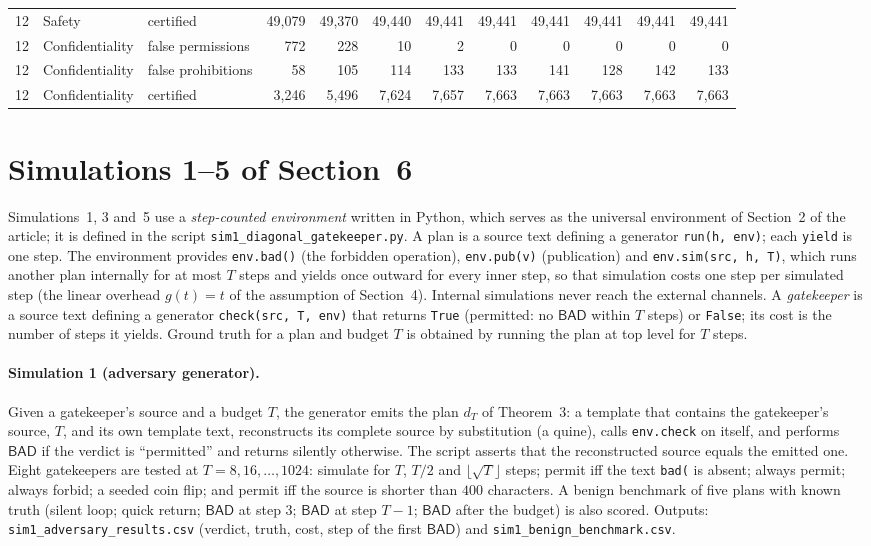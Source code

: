 \documentclass[11pt]{article}
\newcommand{\bad}{\mathsf{BAD}}
\begin{document}
\begin{table}[tbp]
\begin{tabular}{lllrrrrrrrrr}
12 & Safety & certified & 49,079 & 49,370 & 49,440 & 49,441 & 49,441 & 49,441 & 49,441 & 49,441 & 49,441\\
12 & Confidentiality & false permissions & 772 & 228 & 10 & 2 & 0 & 0 & 0 & 0 & 0\\
12 & Confidentiality & false prohibitions & 58 & 105 & 114 & 133 & 133 & 141 & 128 & 142 & 133\\
12 & Confidentiality & certified & 3,246 & 5,496 & 7,624 & 7,657 & 7,663 & 7,663 & 7,663 & 7,663 & 7,663\\
\bottomrule
\end{tabular}
\end{table}

\section{Simulations 1--5 of Section~6}
\label{sec:S1sims}
Simulations~1, 3 and~5 use a \emph{step-counted environment} written in Python, which serves as the universal environment of Section~2 of the article; it is defined in the script \texttt{sim1\_diagonal\_gatekeeper.py}. A plan is a source text defining a generator \texttt{run(h, env)}; each \texttt{yield} is one step. The environment provides \texttt{env.bad()} (the forbidden operation), \texttt{env.pub(v)} (publication) and \texttt{env.sim(src, h, T)}, which runs another plan internally for at most $T$ steps and yields once outward for every inner step, so that simulation costs one step per simulated step (the linear overhead $g(t)=t$ of the assumption of Section~4). Internal simulations never reach the external channels. A \emph{gatekeeper} is a source text defining a generator \texttt{check(src, T, env)} that returns \texttt{True} (permitted: no $\bad$ within $T$ steps) or \texttt{False}; its cost is the number of steps it yields. Ground truth for a plan and budget $T$ is obtained by running the plan at top level for $T$ steps.

\paragraph{Simulation 1 (adversary generator).} Given a gatekeeper's source and a budget $T$, the generator emits the plan $d_T$ of Theorem~3: a template that contains the gatekeeper's source, $T$, and its own template text, reconstructs its complete source by substitution (a quine), calls \texttt{env.check} on itself, and performs $\bad$ if the verdict is ``permitted'' and returns silently otherwise. The script asserts that the reconstructed source equals the emitted one. Eight gatekeepers are tested at $T=8,16,\ldots,1024$: simulate for $T$, $T/2$ and $\lfloor\sqrt T\rfloor$ steps; permit iff the text \texttt{bad(} is absent; always permit; always forbid; a seeded coin flip; and permit iff the source is shorter than $400$ characters. A benign benchmark of five plans with known truth (silent loop; quick return; $\bad$ at step $3$; $\bad$ at step $T-1$; $\bad$ after the budget) is also scored. Outputs: \texttt{sim1\_adversary\_results.csv} (verdict, truth, cost, step of the first $\bad$) and \texttt{sim1\_benign\_benchmark.csv}.
\end{document}
